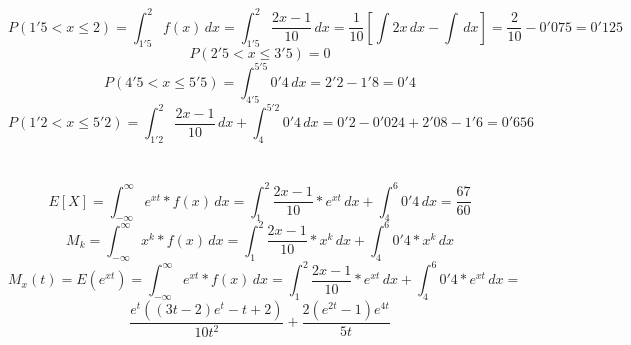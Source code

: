 \problem

\subproblem
\[ P(1'5 < x \leq 2) = \int_{1'5}^{2} f(x) \,dx  = \int_{1'5}^{2} \frac{2x-1}{10} \,dx = \frac{1}{10}[\int 2x \,dx - \int \,dx] = \frac{2}{10} - 0'075 = 0'125\] 
\[P(2'5<x\leq 3'5) = 0\] 
\[P(4'5<x\leq5'5) = \int_{4'5}^{5'5} 0'4 \,dx = 2'2 - 1'8 = 0'4 \]
\[P(1'2 < x \leq 5'2) = \int_{1'2}^2 \frac{2x-1}{10} \,dx + \int_4^{5'2} 0'4 \,dx = 0'2 - 0'024 + 2'08 - 1'6 = 0'656\] \\ \\
\subproblem
\[E[X] = \int_{-\infty}^\infty e^{xt}*f(x) \,dx = \int_1^2 \frac{2x-1}{10}*e^{xt} \,dx + \int_4^6 0'4 \,dx = \frac{67}{60} \] 
\[ M_k = \int_{-\infty}^\infty x^k * f(x) \,dx = \int_1^2 \frac{2x-1}{10}* x^k \,dx + \int_4^6 0'4*x^k \,dx \]
\subproblem
\[M_x(t) = E(e^{xt}) = \int_{-\infty}^{\infty} e^{xt} * f(x) \,dx = \int_1^2 \frac{2x-1}{10}*e^{xt} \,dx + \int_4^6 0'4 * e^{xt} \,dx = \] \[ \frac{e^t((3t-2)e^t-t+2)}{10t^2}+ \frac{2(e^{2t}-1)e^{4t}}{5t}\]
